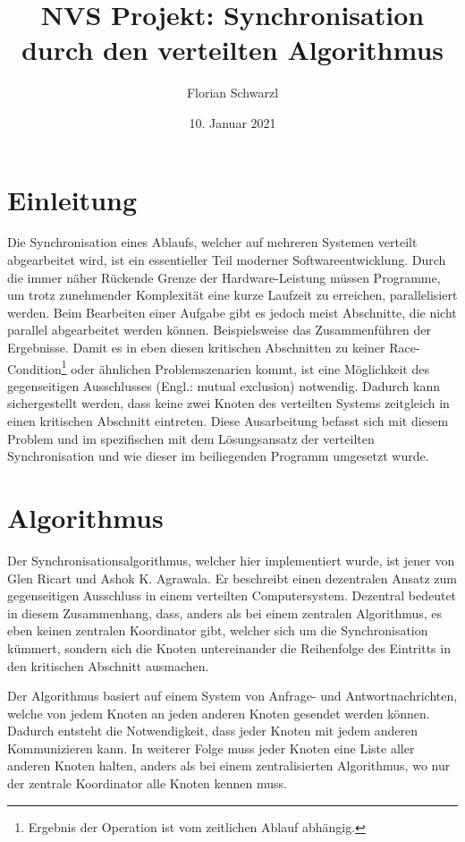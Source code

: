 \documentclass{article}
\begin{document}
\clearpage
\thispagestyle{empty}
\author{Florian Schwarzl}
\date{10. Januar 2021}
\title{NVS Projekt: Synchronisation durch den verteilten Algorithmus}
\maketitle
\clearpage
{}
\tableofcontents
\newpage

\section{Einleitung}
Die Synchronisation eines Ablaufs, welcher auf mehreren Systemen verteilt abgearbeitet wird, ist ein essentieller Teil moderner Softwareentwicklung. Durch die immer näher Rückende Grenze der Hardware-Leistung müssen Programme, um trotz zunehmender Komplexität eine kurze Laufzeit zu erreichen, parallelisiert werden. Beim Bearbeiten einer Aufgabe gibt es jedoch meist Abschnitte, die nicht parallel abgearbeitet werden können. Beispielsweise das Zusammenführen der Ergebnisse. Damit es in eben diesen kritischen Abschnitten zu keiner Race-Condition\footnote{Ergebnis der Operation ist vom zeitlichen Ablauf abhängig.} oder ähnlichen Problemszenarien kommt, ist eine Möglichkeit des gegenseitigen Ausschlusses (Engl.: mutual exclusion) notwendig. Dadurch kann sichergestellt werden, dass keine zwei Knoten des verteilten Systems zeitgleich in einen kritischen Abschnitt eintreten.
Diese Ausarbeitung befasst sich mit diesem Problem und im spezifischen mit dem Lösungsansatz der verteilten Synchronisation und wie dieser im beiliegenden Programm umgesetzt wurde.

\section{Algorithmus}
Der Synchronisationsalgorithmus, welcher hier implementiert wurde, ist jener von Glen Ricart und Ashok K. Agrawala\cite{Ricart}. Er beschreibt einen dezentralen Ansatz zum gegenseitigen Ausschluss in einem verteilten Computersystem. Dezentral bedeutet in diesem Zusammenhang, dass, anders als bei einem zentralen Algorithmus, es eben keinen zentralen Koordinator gibt, welcher sich um die Synchronisation kümmert, sondern sich die Knoten untereinander die Reihenfolge des Eintritts in den kritischen Abschnitt ausmachen.

Der Algorithmus basiert auf einem System von Anfrage- und Antwortnachrichten, welche von jedem Knoten an jeden anderen Knoten gesendet werden können. Dadurch entsteht die Notwendigkeit, dass jeder Knoten mit jedem anderen Kommunizieren kann. In weiterer Folge muss jeder Knoten eine Liste aller anderen Knoten halten, anders als bei einem zentralisierten Algorithmus, wo nur der zentrale Koordinator alle Knoten kennen muss.
\end{document}
